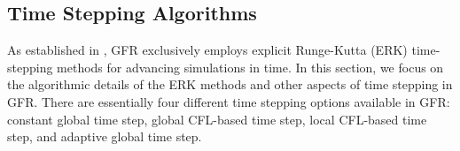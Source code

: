 \subsection{Time Stepping Algorithms}
\label{SEC:Time:Algorithms}

As established in , GFR exclusively employs explicit
Runge-Kutta (ERK) time-stepping methods for advancing simulations in time.
%
In this section, we focus on the algorithmic details of the ERK methods and
other aspects of time stepping in GFR.
%
There are essentially four different time stepping options available in GFR:
constant global time step, global CFL-based time step, local CFL-based time
step, and adaptive global time step.











